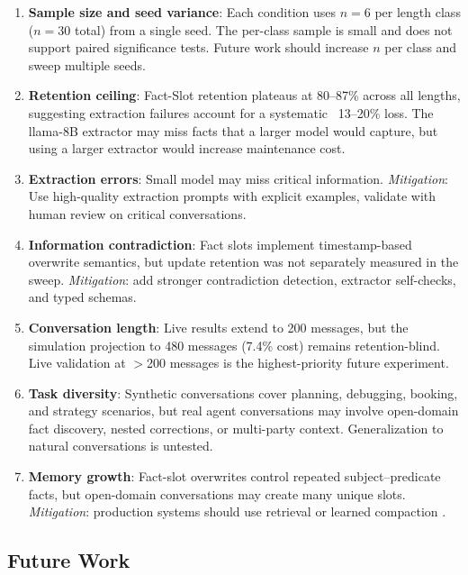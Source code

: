 \documentclass[conference]{IEEEtran}
\begin{document}
\begin{enumerate}
    \item \textbf{Sample size and seed variance}: Each condition uses $n=6$ per length class ($n=30$ total) from a single seed. The per-class sample is small and does not support paired significance tests. Future work should increase $n$ per class and sweep multiple seeds.

    \item \textbf{Retention ceiling}: Fact-Slot retention plateaus at 80--87\% across all lengths, suggesting extraction failures account for a systematic ~13--20\% loss. The llama-8B extractor may miss facts that a larger model would capture, but using a larger extractor would increase maintenance cost.

    \item \textbf{Extraction errors}: Small model may miss critical information. \textit{Mitigation}: Use high-quality extraction prompts with explicit examples, validate with human review on critical conversations.

    \item \textbf{Information contradiction}: Fact slots implement timestamp-based overwrite semantics, but update retention was not separately measured in the sweep. \textit{Mitigation}: add stronger contradiction detection, extractor self-checks, and typed schemas.

    \item \textbf{Conversation length}: Live results extend to 200 messages, but the simulation projection to 480 messages (7.4\% cost) remains retention-blind. Live validation at $>$200 messages is the highest-priority future experiment.

    \item \textbf{Task diversity}: Synthetic conversations cover planning, debugging, booking, and strategy scenarios, but real agent conversations may involve open-domain fact discovery, nested corrections, or multi-party context. Generalization to natural conversations is untested.

    \item \textbf{Memory growth}: Fact-slot overwrites control repeated subject--predicate facts, but open-domain conversations may create many unique slots. \textit{Mitigation}: production systems should use retrieval or learned compaction \cite{karpukhin2020dense}.
\end{enumerate}

\subsection{Future Work}
\end{document}
